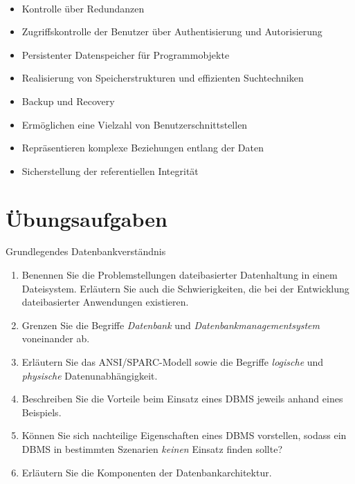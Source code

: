 \begin{frame}{\insertsection}
	\framesubtitle{\insertsubsection}
	\begin{itemize}
		\item Kontrolle über Redundanzen 
		\item Zugriffskontrolle der Benutzer \"uber Authentisierung und Autorisierung
		\item Persistenter Datenspeicher für Programmobjekte 
		\item Realisierung von Speicherstrukturen und effizienten Suchtechniken 
		\item Backup und Recovery 
		\item Ermöglichen eine Vielzahl von Benutzerschnittstellen 
		\item Repräsentieren komplexe Beziehungen entlang der Daten 
		\item Sicherstellung der referentiellen Integrität		
	\end{itemize}
	
\end{frame}

\section*{Übungsaufgaben}
\begin{frame}{\insertsection}
\begin{alertblock}{Grundlegendes Datenbankverständnis}
	\begin{enumerate}
		\item Benennen Sie die Problemstellungen dateibasierter Datenhaltung in einem Dateisystem. Erläutern Sie auch die Schwierigkeiten, die bei der Entwicklung dateibasierter Anwendungen existieren.
		\item Grenzen Sie die Begriffe \textit{Datenbank} und \textit{Datenbankmanagementsystem} voneinander ab.
		\item Erläutern Sie das ANSI/SPARC-Modell sowie die Begriffe \textit{logische} und \textit{physische} Datenunabhängigkeit.
		\item Beschreiben Sie die Vorteile beim Einsatz eines DBMS jeweils anhand eines Beispiels.
		\item Können Sie sich nachteilige Eigenschaften eines DBMS vorstellen, sodass ein DBMS in bestimmten Szenarien \textit{keinen} Einsatz finden sollte?
		\item Erläutern Sie die Komponenten der Datenbankarchitektur.
	\end{enumerate}
	\end{alertblock}
\end{frame}

